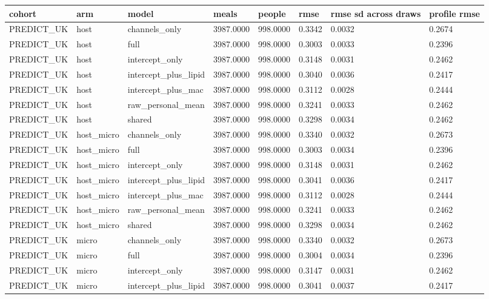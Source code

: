 {\footnotesize\setlength{\tabcolsep}{3pt}
\begin{longtable}{llllllll}
\toprule
\textbf{cohort} & \textbf{arm} & \textbf{model} & \textbf{meals} & \textbf{people} & \textbf{rmse} & \textbf{rmse sd across draws} & \textbf{profile rmse} \\
\midrule
\endhead
PREDICT\_UK & host & channels\_only & 3987.0000 & 998.0000 & 0.3342 & 0.0032 & 0.2674 \\
PREDICT\_UK & host & full & 3987.0000 & 998.0000 & 0.3003 & 0.0033 & 0.2396 \\
PREDICT\_UK & host & intercept\_only & 3987.0000 & 998.0000 & 0.3148 & 0.0031 & 0.2462 \\
PREDICT\_UK & host & intercept\_plus\_lipid & 3987.0000 & 998.0000 & 0.3040 & 0.0036 & 0.2417 \\
PREDICT\_UK & host & intercept\_plus\_mac & 3987.0000 & 998.0000 & 0.3112 & 0.0028 & 0.2444 \\
PREDICT\_UK & host & raw\_personal\_mean & 3987.0000 & 998.0000 & 0.3241 & 0.0033 & 0.2462 \\
PREDICT\_UK & host & shared & 3987.0000 & 998.0000 & 0.3298 & 0.0034 & 0.2462 \\
PREDICT\_UK & host\_micro & channels\_only & 3987.0000 & 998.0000 & 0.3340 & 0.0032 & 0.2673 \\
PREDICT\_UK & host\_micro & full & 3987.0000 & 998.0000 & 0.3003 & 0.0034 & 0.2396 \\
PREDICT\_UK & host\_micro & intercept\_only & 3987.0000 & 998.0000 & 0.3148 & 0.0031 & 0.2462 \\
PREDICT\_UK & host\_micro & intercept\_plus\_lipid & 3987.0000 & 998.0000 & 0.3041 & 0.0036 & 0.2417 \\
PREDICT\_UK & host\_micro & intercept\_plus\_mac & 3987.0000 & 998.0000 & 0.3112 & 0.0028 & 0.2444 \\
PREDICT\_UK & host\_micro & raw\_personal\_mean & 3987.0000 & 998.0000 & 0.3241 & 0.0033 & 0.2462 \\
PREDICT\_UK & host\_micro & shared & 3987.0000 & 998.0000 & 0.3298 & 0.0034 & 0.2462 \\
PREDICT\_UK & micro & channels\_only & 3987.0000 & 998.0000 & 0.3340 & 0.0032 & 0.2673 \\
PREDICT\_UK & micro & full & 3987.0000 & 998.0000 & 0.3004 & 0.0034 & 0.2396 \\
PREDICT\_UK & micro & intercept\_only & 3987.0000 & 998.0000 & 0.3147 & 0.0031 & 0.2462 \\
PREDICT\_UK & micro & intercept\_plus\_lipid & 3987.0000 & 998.0000 & 0.3041 & 0.0037 & 0.2417 \\

\end{longtable}}

